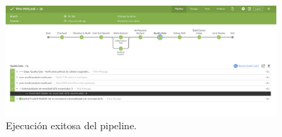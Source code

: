 \begin{figure}[H] 
    \centering
    \includegraphics[width=0.9\textwidth]{contenido/imagenes/4_pipeline_ok.png}
    \caption{Ejecución exitosa del pipeline.}
    \label{fig:pipeline_exitoso}
\end{figure}

